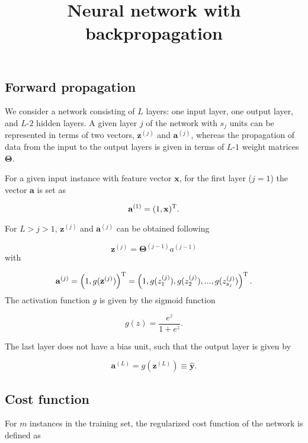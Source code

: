 \documentclass{article}
\title{Neural network with backpropagation}
\begin{document}
\maketitle




\subsection*{Forward propagation}
We consider a network consisting of $L$ layers: one input layer, one output layer, and $L$-$2$ hidden layers.  A given layer $j$ of the network with $s_j$ units can be represented in terms of two vectors, $\mathbf{z}^{(j)}$ and $\mathbf{a}^{(j)}$, whereas the propagation of data from the input to the output layers is given in terms of $L$-$1$ weight matrices $\boldsymbol{\Theta}$.

For a given input instance with feature vector $\mathbf{x}$, for the first layer ($j=1$) the vector $\mathbf{a}$ is set as

\begin{equation}
\mathbf{a}^{(1)} = (1,\mathbf{x})^{\rm T}.
\end{equation}

For $L > j > 1$, $\mathbf{z}^{(j)}$ and $\mathbf{a}^{(j)}$ can be obtained following

\begin{equation}
\mathbf{z}^{(j)} = \boldsymbol{\Theta}^{(j-1)}a^{(j-1)}
\end{equation}
with

\begin{equation}
\mathbf{a}^{(j)} = \left(1,g(\mathbf{z}^{(j)})\right)^{\rm T}=\left(1, g(z^{(j)}_1),g(z^{(j)}_2),...,g(z^{(j)}_{s_j})\right)^{\rm T}.
\end{equation}
The activation function $g$ is given by the sigmoid function

\begin{equation}
g(z) = \frac{e^z}{1+ e^z}.
\end{equation}

The last layer does not have a bias unit, such that the output layer is given by

\begin{equation}
\mathbf{a}^{(L)} = g(\mathbf{z}^{(L)}) \equiv \hat{\mathbf{y}}.
\end{equation}
\newpage
\subsection*{Cost function}
For $m$ instances in the training set, the regularized cost function of the network is defined as 
\end{document}
